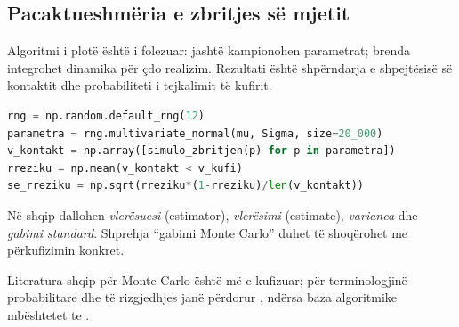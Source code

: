 \subsection{Pacaktueshmëria e zbritjes së mjetit}
Algoritmi i plotë është i folezuar: jashtë kampionohen parametrat; brenda integrohet dinamika për çdo realizim. Rezultati është shpërndarja e shpejtësisë së kontaktit dhe probabiliteti i tejkalimit të kufirit.
\begin{lstlisting}[language=Python]
rng = np.random.default_rng(12)
parametra = rng.multivariate_normal(mu, Sigma, size=20_000)
v_kontakt = np.array([simulo_zbritjen(p) for p in parametra])
rreziku = np.mean(v_kontakt < v_kufi)
se_rreziku = np.sqrt(rreziku*(1-rreziku)/len(v_kontakt))
\end{lstlisting}

\begin{kujdes}
Në shqip dallohen \emph{vlerësuesi} (estimator), \emph{vlerësimi} (estimate), \emph{varianca} dhe \emph{gabimi standard}. Shprehja ``gabimi Monte Carlo'' duhet të shoqërohet me përkufizimin konkret.
\end{kujdes}

Literatura shqip për Monte Carlo është më e kufizuar; për terminologjinë probabilitare dhe të rizgjedhjes janë përdorur \cite{butka,tasho,hyka}, ndërsa baza algoritmike mbështetet te \cite{newman,robert,press}.

